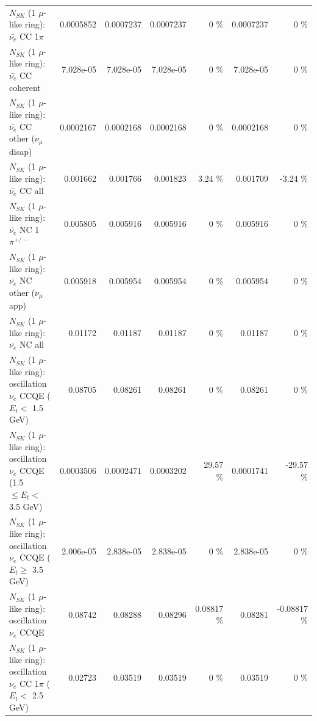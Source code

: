 \begin{table}
\begin{tabular}{| l | r | r | r  r | r  r |}
\hline
                           $N_{SK}$ (1 $\mu$-like ring): $\bar{\nu_e}$ CC 1$\pi$ &       0.0005852 &       0.0007237 &       0.0007237 &        0 \%  &       0.0007237 &        0 \%  \\ 
                         $N_{SK}$ (1 $\mu$-like ring): $\bar{\nu_e}$ CC coherent &       7.028e-05 &       7.028e-05 &       7.028e-05 &        0 \%  &       7.028e-05 &        0 \%  \\ 
          $N_{SK}$ (1 $\mu$-like ring): $\bar{\nu_e}$ CC other ($\nu_\mu$ disap) &       0.0002167 &       0.0002168 &       0.0002168 &        0 \%  &       0.0002168 &        0 \%  \\ 
                            $N_{SK}$ (1 $\mu$-like ring): $\bar{\nu_{e}}$ CC all &        0.001662 &        0.001766 &        0.001823 &     3.24 \%  &        0.001709 &    -3.24 \%  \\ 
\hline
                     $N_{SK}$ (1 $\mu$-like ring): $\bar{\nu_e}$ NC 1$\pi^{+/-}$ &        0.005805 &        0.005916 &        0.005916 &        0 \%  &        0.005916 &        0 \%  \\ 
            $N_{SK}$ (1 $\mu$-like ring): $\bar{\nu_e}$ NC other ($\nu_\mu$ app) &        0.005918 &        0.005954 &        0.005954 &        0 \%  &        0.005954 &        0 \%  \\ 
                            $N_{SK}$ (1 $\mu$-like ring): $\bar{\nu_{e}}$ NC all &         0.01172 &         0.01187 &         0.01187 &        0 \%  &         0.01187 &        0 \%  \\ 
\hline
\hline
\hline
      $N_{SK}$ (1 $\mu$-like ring): oscillation $\nu_e$ CCQE ($E_{t} <$ 1.5 GeV) &         0.08705 &         0.08261 &         0.08261 &        0 \%  &         0.08261 &        0 \%  \\ 
$N_{SK}$ (1 $\mu$-like ring): oscillation $\nu_e$ CCQE (1.5 $\leq E_{t} <$ 3.5 GeV) &       0.0003506 &       0.0002471 &       0.0003202 &    29.57 \%  &       0.0001741 &   -29.57 \%  \\ 
   $N_{SK}$ (1 $\mu$-like ring): oscillation $\nu_e$ CCQE ($E_{t} \geq$ 3.5 GeV) &       2.006e-05 &       2.838e-05 &       2.838e-05 &        0 \%  &       2.838e-05 &        0 \%  \\ 
\hline
                          $N_{SK}$ (1 $\mu$-like ring): oscillation $\nu_e$ CCQE &         0.08742 &         0.08288 &         0.08296 &  0.08817 \%  &         0.08281 & -0.08817 \%  \\ 
\hline
 $N_{SK}$ (1 $\mu$-like ring): oscillation $\nu_e$ CC 1$\pi$ ($E_{t} <$ 2.5 GeV) &         0.02723 &         0.03519 &         0.03519 &        0 \%  &         0.03519 &        0 \%  \\ 

\end{tabular}
\end{table}

